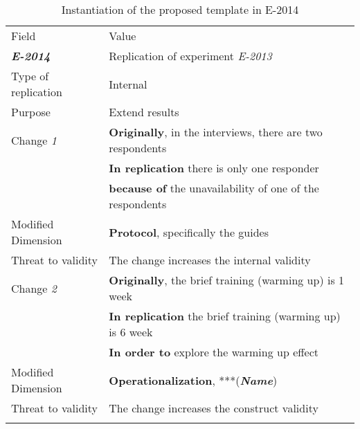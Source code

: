 \begin{table*}[h]
  \caption{Instantiation of the proposed template in E-2014}
\label{tab:plantEng}
  \centering

\begin{tabularx}{\textwidth}{
  >{\hsize=0.3\hsize}X
  >{\hsize=0.8\hsize}X}
  
    \noalign{\smallskip}\hline\noalign{\smallskip}
  
  Field &  Value  \\ 
  \noalign{\smallskip}\hline\noalign{\smallskip}
  
\textbf {\textit{E-2014}} &  Replication of experiment \textit{E-2013}    \\
Type of replication &  Internal   \\  
Purpose  &  Extend results \\   \hline

 Change \textit{1}   & \textbf{Originally}, in the interviews, there are two respondents\\& \textbf{In replication} there  is only one responder \\& \textbf{because of}  the unavailability of one of the respondents \\ 

    Modified Dimension & 
    \textbf{Protocol}, specifically the guides \\
    Threat to validity & The change increases the internal validity  \\  \hline
    
    Change \textit{2}   & \textbf{Originally}, the brief training (warming up) is 1 week \\& \textbf{In replication} the brief training (warming up) is 6 week \\& \textbf{In order to} explore the warming up effect \\
    
   Modified Dimension & 
   \textbf{Operationalization}, ***(\textbf{\textit{Name}}) \\ 
    Threat to validity & The change increases the construct validity \\  
  \noalign{\smallskip\smallskip}\hline
    
	\end{tabularx}  
	
\end{table*}
